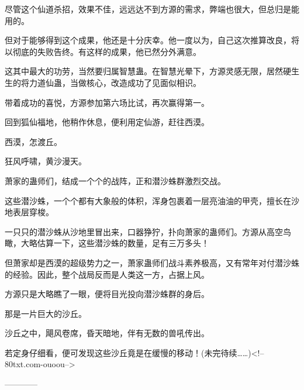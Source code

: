 \begin{this_body}
尽管这个仙道杀招，效果不佳，远远达不到方源的需求，弊端也很大，但总归是能用的。

但对于能够得到这个成果，他还是十分庆幸。他一度以为，自己这次推算改良，将以彻底的失败告终。有这样的成果，他已然分外满意。

这其中最大的功劳，当然要归属智慧蛊。在智慧光晕下，方源灵感无限，居然硬生生的将力道仙蛊，当做核心，改造成功了见面似相识。

带着成功的喜悦，方源参加第六场比试，再次赢得第一。

回到狐仙福地，他稍作休息，便利用定仙游，赶往西漠。

西漠，怎渡丘。

狂风呼啸，黄沙漫天。

萧家的蛊师们，结成一个个的战阵，正和潜沙蛛群激烈交战。

这些潜沙蛛，一个个都有大象般的体积，浑身包裹着一层亮油油的甲壳，擅长在沙地表层穿梭。

一只只的潜沙蛛从沙地里冒出来，口器狰狞，扑向萧家的蛊师们。方源从高空鸟瞰，大略估算一下，这些潜沙蛛的数量，足有三万多头！

但萧家却是西漠的超级势力之一，萧家蛊师们战斗素养极高，又有常年对付潜沙蛛的经验。因此，整个战局反而是人类这一方，占据上风。

方源只是大略瞧了一眼，便将目光投向潜沙蛛群的身后。

那是一片巨大的沙丘。

沙丘之中，飓风卷席，昏天暗地，伴有无数的兽吼传出。

若定身仔细看，便可发现这些沙丘竟是在缓慢的移动！(未完待续……)<!--80txt.com-ouoou-->

------------

\end{this_body}

